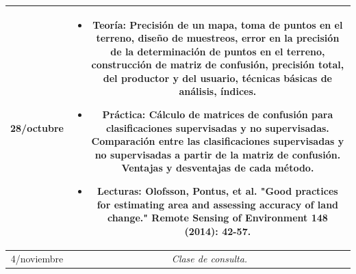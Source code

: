 \documentclass[11pt]{article}
\begin{document}
\begin{longtable}[h!]{| c | c | }
\midrule
28/octubre & \begin{minipage}{.65\textwidth}
\begin{itemize}
    \vspace{1mm}
	\item Teoría: Precisión de un mapa, toma de puntos en el terreno, diseño de muestreos, error en la precisión de la determinación de puntos en el terreno, construcción de matriz de confusión, precisión total, del productor y del usuario, técnicas básicas de análisis, índices.
  \item Práctica: Cálculo de matrices de confusión para clasificaciones supervisadas y no supervisadas. Comparación entre las clasificaciones supervisadas y no supervisadas a partir de la matriz de confusión. Ventajas y desventajas de cada método.
	\item Lecturas: Olofsson, Pontus, et al. "Good practices for estimating area and assessing accuracy of land change." Remote Sensing of Environment 148 (2014): 42-57.
    \vspace{1mm}
\end{itemize}
\end{minipage} \\

\midrule
    \vspace{1mm}
4/noviembre & \begin{minipage}{.65\textwidth}
\emph{Clase de consulta.}
\end{minipage} \\
\bottomrule

\end{longtable}
\end{document}
